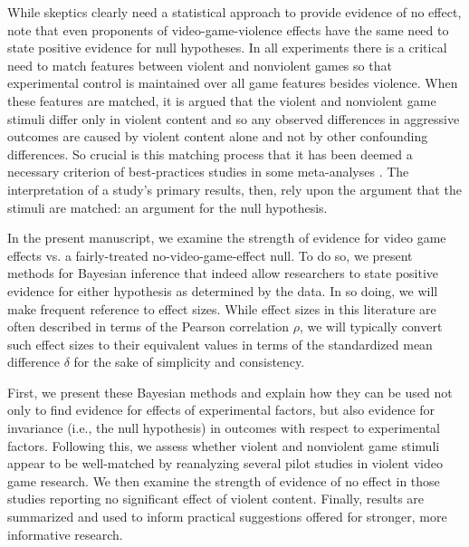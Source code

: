 \documentclass[man]{apa6}
\begin{document}
While skeptics clearly need a statistical approach to provide evidence of no effect, note that even proponents of video-game-violence effects have the same need to state positive evidence for null hypotheses.  In all experiments there is a critical need to match features between violent and nonviolent games so that experimental control is maintained over all game features besides violence.  When these features are matched, it is argued that the violent and nonviolent game stimuli differ only in violent content and so any observed differences in aggressive outcomes are caused by violent content alone and not by other confounding differences.  So crucial is this matching process that it has been deemed a necessary criterion of best-practices studies in some meta-analyses \citep{Anderson:etal:2010}. The interpretation of a study's primary results, then, rely upon the argument that the stimuli are matched: an argument for the null hypothesis.  

In the present manuscript, we examine the strength of evidence for video game effects vs. a fairly-treated no-video-game-effect null.  To do so, we present methods for Bayesian inference that indeed allow researchers to state positive evidence for either hypothesis as determined by the data. In so doing, we will make frequent reference to effect sizes. While effect sizes in this literature are often described in terms of the Pearson correlation $\rho$, we will typically convert such effect sizes to their equivalent values in terms of the standardized mean difference $\delta$ for the sake of simplicity and consistency.

First, we present these Bayesian methods and explain how they can be used not only to find evidence for effects of experimental factors, but also evidence for invariance (i.e., the null hypothesis) in outcomes with respect to experimental factors. Following this, we assess whether violent and nonviolent game stimuli appear to be well-matched by reanalyzing several pilot studies in violent video game research.  We then examine the strength of evidence of no effect in those studies reporting no significant effect of violent content.  Finally, results are summarized and used to inform practical suggestions offered for stronger, more informative research. 
\end{document}
